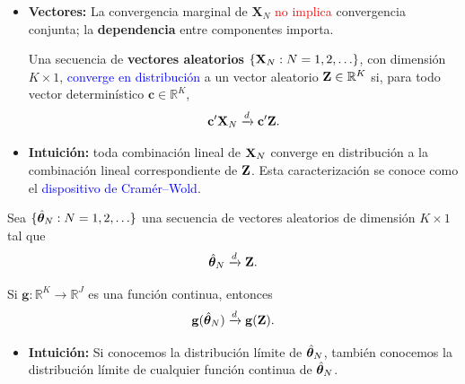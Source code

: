 \documentclass[10pt, xcolor=dvipsnames]{beamer}
\begin{document}
\begin{frame}[plain]
\begin{itemize}
    \item \textbf{Vectores:} La convergencia marginal de $\mathbf{X}_N$ \textcolor{red}{no implica} convergencia conjunta; la \textbf{dependencia} entre componentes importa. %
    \vspace{0.75em}
\begin{tcolorbox}[colback=white, arc=0mm, boxrule=0.5pt, 
    title=\textbf{Definición: Convergencia en distribución (vectores)}, breakable]
    Una secuencia de \textbf{vectores aleatorios} 
    \(\{\textbf{X}_N : N=1,2,\ldots\}\), con dimensión \(K \times 1\), 
    \textcolor{blue}{converge en distribución} a un vector aleatorio \(\textbf{Z} \in \mathbb{R}^{K}\) si, 
    para todo vector determinístico \(\mathbf{c} \in \mathbb{R}^K\),
    \[
        \mathbf{c}' \textbf{X}_N \xrightarrow{d} \mathbf{c}' \textbf{Z}.
    \]
\end{tcolorbox}
    \item \textbf{Intuición:} toda combinación lineal de \(\textbf{X}_N\) converge en distribución 
    a la combinación lineal correspondiente de \(\textbf{Z}\). Esta caracterización se conoce como el \textcolor{blue}{dispositivo de Cramér--Wold}.
\end{itemize}
\end{frame}


\begin{frame}[plain]
\begin{tcolorbox}[colback=white, arc=0mm, boxrule=0.5pt, 
    title=\textbf{Teorema del mapeo continuo (convergencia en distribución)}, breakable]
    Sea \(\{\hat{\boldsymbol{\theta}}_N : N=1,2,\ldots\}\) una secuencia de vectores aleatorios 
    de dimensión \(K \times 1\) tal que 
    \vspace{-1em}
    \[
        \hat{\boldsymbol{\theta}}_N \xrightarrow{d} \textbf{Z}.
    \]
    
    \vspace{-0.75em}
    Si \(\mathbf{g}: \mathbb{R}^K \to \mathbb{R}^J\) es una función continua, entonces
    \vspace{-0.75em}
    \[
        \mathbf{g}(\hat{\boldsymbol{\theta}}_N) \xrightarrow{d} \mathbf{g}(\textbf{Z}).
    \]
\end{tcolorbox}
\begin{itemize}
    \item \textbf{Intuición:} Si conocemos la distribución límite de \(\hat{\boldsymbol{\theta}}_N\), también conocemos la distribución límite de cualquier función continua de \(\hat{\boldsymbol{\theta}}_N\).
\end{itemize}
\end{frame}
\end{document}
